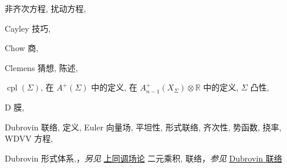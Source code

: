 \begin{theindex}
\subitem \leavevmode\hypertarget{idx:0116}{非齐次方程},\enspace{}
\subitem \leavevmode\hypertarget{idx:0117}{扰动方程},\enspace{}
\indexspace
\item \leavevmode\hypertarget{idx:0118}{Cayley 技巧},\enspace{}
\indexspace
\item \leavevmode\hypertarget{idx:0122}{Chow 商},\enspace{}
\indexspace
\item \leavevmode\hypertarget{idx:0124}{Clemens 猜想},\enspace{}
\subitem \leavevmode\hypertarget{idx:0125}{陈述},\enspace{}
\indexspace
\item \leavevmode\hypertarget{source:478}{}\hypertarget{idx:0199}{$\operatorname{cpl}(\Sigma)$},\enspace{}
\subitem \leavevmode\hypertarget{idx:0200}{在 $A^+(\Sigma)$ 中的定义},\enspace{}
\subitem \leavevmode\hypertarget{idx:0201}{在 $A^+_{n-1}(X_\Sigma)\otimes\mathbb R$ 中的定义},\enspace{}
\subitem \leavevmode\hypertarget{idx:0202}{$\Sigma$ 凸性},\enspace{}
\indexspace
\item \leavevmode\hypertarget{idx:0207}{D 膜},\enspace{}
\indexspace
\item \leavevmode\hypertarget{idx:0226}{Dubrovin 联络},\enspace{}
\subitem \leavevmode\hypertarget{idx:0227}{定义},\enspace{}
\subitem \leavevmode\hypertarget{idx:0228}{Euler 向量场},\enspace{}
\subitem \leavevmode\hypertarget{idx:0229}{平坦性},\enspace{}
\subitem \leavevmode\hypertarget{idx:0230}{形式联络},\enspace{}
\subitem \leavevmode\hypertarget{idx:0231}{齐次性},\enspace{}
\subitem \leavevmode\hypertarget{idx:0232}{势函数},\enspace{}
\subitem \leavevmode\hypertarget{idx:0233}{挠率},\enspace{}
\subitem \leavevmode\hypertarget{idx:0234}{WDVV 方程},\enspace{}
\indexspace
\item \leavevmode\hypertarget{idx:0235}{Dubrovin 形式体系},\enspace{}，\textit{另见} \hyperlink{idx:0126}{上同调场论}
\subitem \leavevmode\hypertarget{idx:0236}{二元乘积},\enspace{}
\subitem \leavevmode\hypertarget{idx:0237}{联络}，\textit{参见} \hyperlink{idx:0226}{Dubrovin 联络}

\end{theindex}
